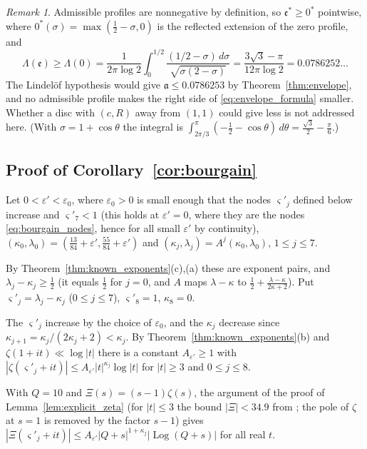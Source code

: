 \documentclass[11pt,a4paper]{article}
\makeatletter
\numberwithin{equation}{section}
\DeclareRobustCommand{\CGref}[1]{\ref{#1}}
\DeclareRobustCommand{\CGeqref}[1]{\eqref{#1}}
\DeclareRobustCommand{\CGcite}[2][]{\if\relax\detokenize{#1}\relax\cite{#2}\else\cite[#1]{#2}\fi}
\let\CG@origref\ref
\let\CG@origeqref\eqref
\newcommand{\CG@gettip}[1]{\@ifundefined{CGTip@#1}{#1}{\csname CGTip@#1\endcsname}}
\newcommand{\CG@getbib}[1]{\@ifundefined{CGBib@#1}{#1}{\csname CGBib@#1\endcsname}}
\DeclareRobustCommand{\CGref}[1]{\pdftooltip{\CG@origref{#1}}{\CG@gettip{#1}}}
\DeclareRobustCommand{\CGeqref}[1]{\pdftooltip{\CG@origeqref{#1}}{\CG@gettip{#1}}}
\DeclareRobustCommand{\CGcite}[2][]{\pdftooltip{\if\relax\detokenize{#1}\relax\cite{#2}\else\cite[#1]{#2}\fi}{\CG@getbib{#2}}}
\theoremstyle{definition}
\theoremstyle{remark}
\newtheorem{remark}[theorem]{Remark}
\makeatother
\begin{document}
\begin{remark}\label{rem:lindelof}
Admissible profiles are nonnegative by definition, so $\mathfrak e^*\ge0^*$ pointwise, where $0^*(\sigma)=\max(\frac12-\sigma,0)$ is the reflected extension of the zero profile, and
\[
\Lambda(\mathfrak e)\ge\Lambda(0)=\frac1{2\pi\log2}\int_0^{1/2}\frac{(1/2-\sigma)\,d\sigma}{\sqrt{\sigma(2-\sigma)}}=\frac{3\sqrt3-\pi}{12\pi\log2}=0.0786252\ldots
\]
The Lindel\"of hypothesis would give $\mathfrak a\le0.0786253$ by Theorem~\CGref{thm:envelope}, and no admissible profile makes the right side of \CGeqref{eq:envelope_formula} smaller. Whether a disc with $(c,R)$ away from $(1,1)$ could give less is not addressed here.
(With $\sigma=1+\cos\theta$ the integral is $\int_{2\pi/3}^\pi(-\frac12-\cos\theta)\,d\theta=\frac{\sqrt3}2-\frac\pi6$.)
\end{remark}

\subsection{Proof of Corollary~\ref{cor:bourgain}}\label{subsec:proof_bourgain}
Let $0<\varepsilon'<\varepsilon_0$, where $\varepsilon_0>0$ is small enough that the nodes $\varsigma'_j$ defined below increase and $\varsigma'_7<1$ (this holds at $\varepsilon'=0$, where they are the nodes \CGeqref{eq:bourgain_nodes}, hence for all small $\varepsilon'$ by continuity), $(\kappa_0,\lambda_0)=(\frac{13}{84}+\varepsilon',\frac{55}{84}+\varepsilon')$ and $(\kappa_j,\lambda_j)=A^j(\kappa_0,\lambda_0)$, $1\le j\le7$.

By Theorem~\CGref{thm:known_exponents}(c),(a) these are exponent pairs, and $\lambda_j-\kappa_j\ge\frac12$ (it equals $\frac12$ for $j=0$, and $A$ maps $\lambda-\kappa$ to $\frac12+\frac{\lambda-\kappa}{2\kappa+2}$). Put $\varsigma'_j=\lambda_j-\kappa_j$ ($0\le j\le7$), $\varsigma'_8=1$, $\kappa_8=0$.

The $\varsigma'_j$ increase by the choice of $\varepsilon_0$, and the $\kappa_j$ decrease since $\kappa_{j+1}=\kappa_j/(2\kappa_j+2)<\kappa_j$. By Theorem~\CGref{thm:known_exponents}(b) and $\zeta(1+it)\ll\log|t|$ there is a constant $A_{\varepsilon'}\ge1$ with $|\zeta(\varsigma'_j+it)|\le A_{\varepsilon'}|t|^{\kappa_j}\log|t|$ for $|t|\ge3$ and $0\le j\le8$.

With $Q=10$ and $\Xi(s)=(s-1)\zeta(s)$, the argument of the proof of Lemma~\CGref{lem:explicit_zeta} (for $|t|\le3$ the bound $|\Xi|<34.9$ from \CGcite[(2.1.4)]{Titchmarsh1986}; the pole of $\zeta$ at $s=1$ is removed by the factor $s-1$) gives $|\Xi(\varsigma'_j+it)|\le A_{\varepsilon'}|Q+s|^{1+\kappa_j}|\operatorname{Log}(Q+s)|$ for all real $t$.
\end{document}
